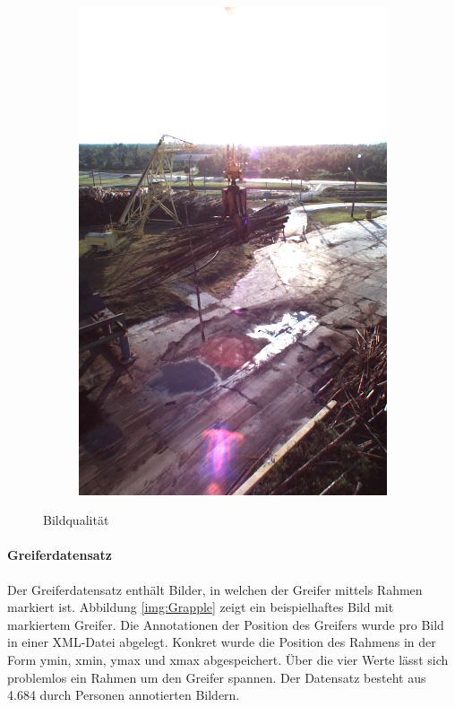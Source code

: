 \begin{figure}[h]
\begin{subfigure}[c]{0.24\textwidth}
			\includegraphics[width=1\textwidth]{bilder/Grundlagen/Daten_Bildqualitaet/Reflexionen.png}
		\end{subfigure}
		\caption{Bildqualität}
		\label{img:Bildqualität}
	\end{figure}
		
	\paragraph{Greiferdatensatz} Der Greiferdatensatz enthält Bilder, in welchen der Greifer mittels Rahmen markiert ist. Abbildung \ref{img:Grapple} zeigt ein beispielhaftes Bild mit markiertem Greifer. Die Annotationen der Position des Greifers wurde pro Bild in einer XML-Datei abgelegt. Konkret wurde die Position des Rahmens in der Form ymin, xmin, ymax und xmax abgespeichert. Über die vier Werte lässt sich problemlos ein Rahmen um den Greifer spannen. Der Datensatz besteht aus 4.684 durch Personen annotierten Bildern.
	
